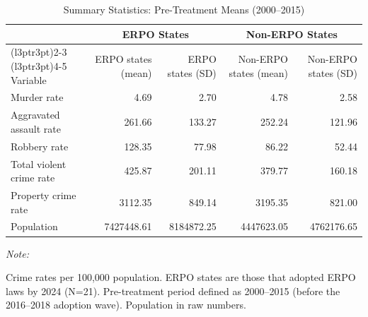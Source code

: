 \begin{table}[!h]
\centering
\caption{\label{tab:tab:summary}Summary Statistics: Pre-Treatment Means (2000--2015)}
\centering
\begin{threeparttable}
\begin{tabular}[t]{lrrrr}
\toprule
\multicolumn{1}{c}{ } & \multicolumn{2}{c}{ERPO States} & \multicolumn{2}{c}{Non-ERPO States} \\
\cmidrule(l{3pt}r{3pt}){2-3} \cmidrule(l{3pt}r{3pt}){4-5}
Variable & ERPO states (mean) & ERPO states (SD) & Non-ERPO states (mean) & Non-ERPO states (SD)\\
\midrule
Murder rate & 4.69 & 2.70 & 4.78 & 2.58\\
Aggravated assault rate & 261.66 & 133.27 & 252.24 & 121.96\\
Robbery rate & 128.35 & 77.98 & 86.22 & 52.44\\
Total violent crime rate & 425.87 & 201.11 & 379.77 & 160.18\\
Property crime rate & 3112.35 & 849.14 & 3195.35 & 821.00\\
\addlinespace
Population & 7427448.61 & 8184872.25 & 4447623.05 & 4762176.65\\
\bottomrule
\end{tabular}
\begin{tablenotes}
\item \textit{Note: } 
\item Crime rates per 100,000 population. ERPO states are those that adopted ERPO laws by 2024 (N=21). Pre-treatment period defined as 2000--2015 (before the 2016--2018 adoption wave). Population in raw numbers.
\end{tablenotes}
\end{threeparttable}
\end{table}
